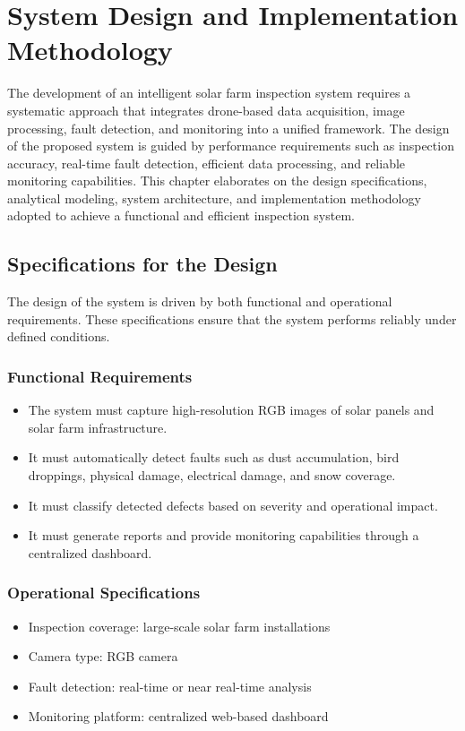 \chapter{System Design and Implementation Methodology}

The development of an intelligent solar farm inspection system requires a systematic approach that integrates drone-based data acquisition, image processing, fault detection, and monitoring into a unified framework. The design of the proposed system is guided by performance requirements such as inspection accuracy, real-time fault detection, efficient data processing, and reliable monitoring capabilities. This chapter elaborates on the design specifications, analytical modeling, system architecture, and implementation methodology adopted to achieve a functional and efficient inspection system.

\section{Specifications for the Design}

The design of the system is driven by both functional and operational requirements. These specifications ensure that the system performs reliably under defined conditions.

\subsection{Functional Requirements}

\begin{itemize}
\item The system must capture high-resolution RGB images of solar panels and solar farm infrastructure.
\item It must automatically detect faults such as dust accumulation, bird droppings, physical damage, electrical damage, and snow coverage.
\item It must classify detected defects based on severity and operational impact.
\item It must generate reports and provide monitoring capabilities through a centralized dashboard.
\end{itemize}

\subsection{Operational Specifications}

\begin{itemize}
\item Inspection coverage: large-scale solar farm installations
\item Camera type: RGB camera
\item Fault detection: real-time or near real-time analysis
\item Monitoring platform: centralized web-based dashboard
\end{itemize}

